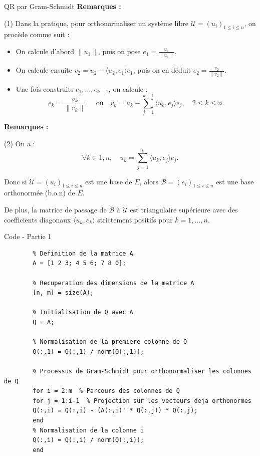 \documentclass[french, 10pt]{beamer}
\theoremstyle{definition}
\begin{document}
\begin{frame}{QR par Gram-Schmidt}
	\textbf{Remarques :}
	

		(1) Dans la pratique, pour orthonormaliser un système libre \( \mathcal{U} = (u_i)_{1 \leq i \leq n} \), on procède comme suit :
		
		\begin{itemize}[label= -]
			\item On calcule d’abord \( \|u_1\| \), puis on pose \( e_1 = \frac{u_1}{\|u_1\|} \).
			\item On calcule ensuite \( v_2 = u_2 - \langle u_2, e_1 \rangle e_1 \), puis on en déduit \( e_2 = \frac{v_2}{\|v_2\|} \).
			\item Une fois construits \( e_1, \dots, e_{k-1} \), on calcule :
			\[
			e_k = \frac{v_k}{\|v_k\|}, \quad \text{où} \quad v_k = u_k - \sum_{j=1}^{k-1} \langle u_k, e_j \rangle e_j, \quad 2 \leq k \leq n.
			\]
		\end{itemize}
		
\end{frame}

\begin{frame}
	\textbf{Remarques :}
	
	
	(2) On a :
		\[
		\forall k \in  1, n , \quad u_k = \sum_{j=1}^{k} \langle u_k, e_j \rangle e_j.
		\]
		
		Donc si \( \mathcal{U} = (u_i)_{1 \leq i \leq n} \) est une base de \( E \), alors \( \mathcal{B} = (e_i)_{1 \leq i \leq n} \) est une base orthonormée (b.o.n) de \( E \).
		
		De plus, la matrice de passage de \( \mathcal{B} \) à \( \mathcal{U} \) est triangulaire supérieure avec des coefficients diagonaux \( \langle u_k, e_k \rangle \) strictement positifs pour \( k = 1, \dots, n \).
	
\end{frame}

\begin{frame}[fragile]{Code - Partie 1}
	\begin{lstlisting}
		% Definition de la matrice A
		A = [1 2 3; 4 5 6; 7 8 0];
		
		% Recuperation des dimensions de la matrice A
		[n, m] = size(A); 
		
		% Initialisation de Q avec A
		Q = A;
		
		% Normalisation de la premiere colonne de Q
		Q(:,1) = Q(:,1) / norm(Q(:,1));
		
		% Processus de Gram-Schmidt pour orthonormaliser les colonnes de Q
		for i = 2:m  % Parcours des colonnes de Q
		for j = 1:i-1  % Projection sur les vecteurs deja orthonormes
		Q(:,i) = Q(:,i) - (A(:,i)' * Q(:,j)) * Q(:,j);
		end
		% Normalisation de la colonne i
		Q(:,i) = Q(:,i) / norm(Q(:,i));
		end
	\end{lstlisting}
\end{frame}
\end{document}
